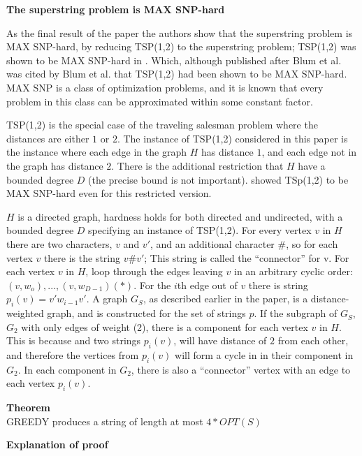 \documentclass[letterpaper,11pt,titlepage]{article}
\begin{document}
\textbf{The superstring problem is MAX SNP-hard}

As the final result of the paper the authors show that the superstring problem is MAX SNP-hard, by reducing TSP(1,2) to the superstring problem; TSP(1,2) was shown to be MAX SNP-hard in \cite{papadimitriou1993}.  Which, although published after Blum et al. was cited by Blum et al. that TSP(1,2) had been shown to be MAX SNP-hard.  MAX SNP is a class of optimization problems, and it is known that every problem in this class can be approximated within some constant factor. 

TSP(1,2) is the special case of the traveling salesman problem where the distances are either $1$ or $2$.  The instance of TSP(1,2) considered in this paper is the instance where each edge in the graph $H$ has distance $1$, and each edge not in the graph has distance $2$.  There is the additional restriction that $H$ have a bounded degree $D$ (the precise bound is not important).  \cite{papadimitriou1993} showed TSp(1,2) to be MAX SNP-hard even for this restricted version.  


$H$ is a directed graph, hardness holds for both directed and undirected, with a bounded degree $D$ specifying an instance of TSP(1,2).  For every vertex $v$ in $H$ there are two characters, $v$ and $v'$, and an additional character $\#$, so for each vertex $v$ there is the string $v\#v'$; This string is called the ``connector'' for v.  For each vertex $v$ in $H$, loop through the edges leaving $v$ in an arbitrary cyclic order: $(v, w_o),...,(v,w_{D-1})(*)$.  For the $i$th edge out of $v$ there is string $p_i(v) = v'w_{i-1}v'$.  A graph $G_S$, as described earlier in the paper, is a distance-weighted graph, and is constructed for the set of strings $p$.  If the subgraph of $G_S$, $G_2$ with only edges of weight (2), there is a component for each vertex $v$ in $H$.  This is because and two strings $p_i(v)$, will have distance of $2$ from each other, and therefore the vertices from $p_i(v)$ will form a cycle in in their component in $G_2$.  In each component in $G_2$, there is also a ``connector'' vertex with an edge to each vertex $p_i(v)$.  




\textbf{Theorem}\\
GREEDY produces a string of length at most $4 * OPT(S)$

\textbf{Explanation of proof}
\end{document}
